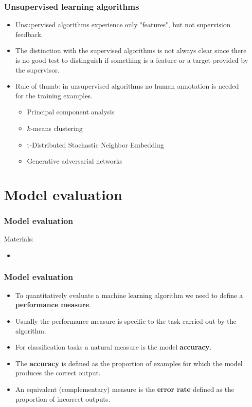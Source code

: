 \documentclass[notes]{beamer}          %
\begin{document}
\begin{frame}
\frametitle{Unsupervised learning algorithms}
    \begin{itemize}
        \item Unsupervised algorithms experience only "features", but not supervision feedback.
        \item The distinction with the supervised algorithms is not always clear since there is no good test to distinguish if something is a feature or a target provided by the supervisor.
        \item Rule of thumb: in unsupervised algorithms no human annotation is needed for the training examples.
        \begin{itemize}
            \item Principal component analysis
            \item $k$-means clustering
            \item t-Distributed Stochastic Neighbor Embedding
            \item Generative adversarial networks
        \end{itemize}
    \end{itemize}
\end{frame}

\section{Model evaluation}

\begin{frame}
\frametitle{Model evaluation}
Materials:
\begin{itemize}
    \item \cite{ROC}
\end{itemize}
\end{frame}


\begin{frame}
\frametitle{Model evaluation}
    \begin{itemize}
        \item To quantitatively evaluate a machine learning algorithm we need to define a {\bf performance measure}.
        \item Usually the performance measure is specific to the task carried out by the algorithm.
        \item For classification tasks a natural measure is the model {\bf accuracy}.
        \item The {\bf accuracy} is defined as the proportion of examples for which the model produces the correct output.
        \item An equivalent (complementary) measure is the {\bf error rate} defined as the proportion of incorrect outputs.
    \end{itemize}
\end{frame}
\end{document}
